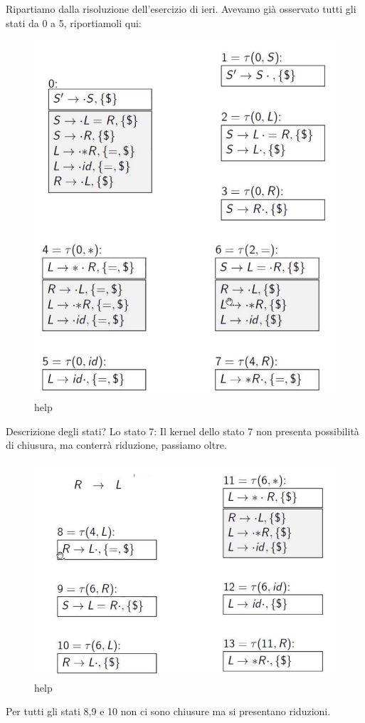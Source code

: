\documentclass[class=book, crop=false, oneside, 12pt]{standalone}
\begin{document}
Ripartiamo dalla risoluzione dell'esercizio di ieri.
Avevamo già osservato tutti gli stati da 0 a 5, riportiamoli qui:
\begin{figure}[H]
    \centering
    \includegraphics[width=.8\textwidth]{send_help_1.png}
    \caption{help}
\end{figure}
Descrizione degli stati?
Lo stato 7:
Il kernel dello stato 7 non presenta possibilità di chiusura, ma conterrà riduzione, passiamo oltre.
\begin{figure}[H]
    \centering
    \includegraphics[width=.8\textwidth]{send_help_2.png}
    \caption{help}
\end{figure}
Per tutti gli stati 8,9 e 10 non ci sono chiusure ma si presentano riduzioni.
\end{document}
